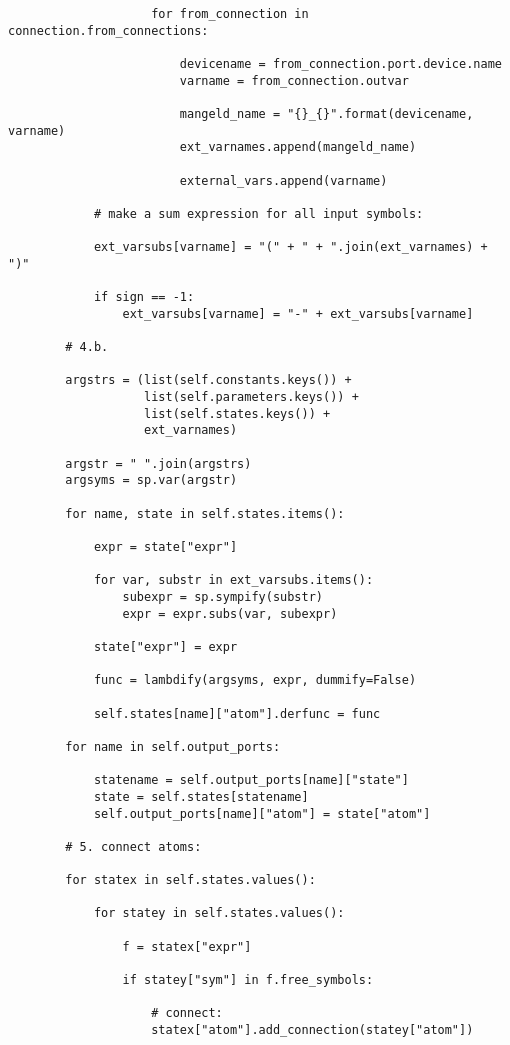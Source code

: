\begin{lstlisting}
                    for from_connection in connection.from_connections:

                        devicename = from_connection.port.device.name
                        varname = from_connection.outvar

                        mangeld_name = "{}_{}".format(devicename, varname)
                        ext_varnames.append(mangeld_name)

                        external_vars.append(varname)

            # make a sum expression for all input symbols:

            ext_varsubs[varname] = "(" + " + ".join(ext_varnames) + ")"

            if sign == -1:
                ext_varsubs[varname] = "-" + ext_varsubs[varname]

        # 4.b.

        argstrs = (list(self.constants.keys()) +
                   list(self.parameters.keys()) +
                   list(self.states.keys()) +
                   ext_varnames)

        argstr = " ".join(argstrs)
        argsyms = sp.var(argstr)

        for name, state in self.states.items():

            expr = state["expr"]

            for var, substr in ext_varsubs.items():
                subexpr = sp.sympify(substr)
                expr = expr.subs(var, subexpr)

            state["expr"] = expr

            func = lambdify(argsyms, expr, dummify=False)

            self.states[name]["atom"].derfunc = func

        for name in self.output_ports:

            statename = self.output_ports[name]["state"]
            state = self.states[statename]
            self.output_ports[name]["atom"] = state["atom"]

        # 5. connect atoms:

        for statex in self.states.values():

            for statey in self.states.values():

                f = statex["expr"]

                if statey["sym"] in f.free_symbols:

                    # connect:
                    statex["atom"].add_connection(statey["atom"])


\end{lstlisting}
